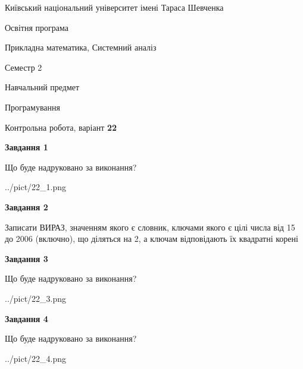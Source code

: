 \documentclass[12pt, ukrainian]{article}
\begin{document}
{{\begin {small}\par
{ \center  Київський національний університет імені Тараса Шевченка \par}
{\parbox {5 cm}{Освітня програма \hfill}{\parbox {8 cm}{Прикладна математика, Системний аналіз \hfill}}\parbox {5 cm}{\hfill Семестр 2}}\par
{\parbox {5 cm} {Навчальний предмет \hfill}\parbox {7 cm}{Програмування \hfill}\parbox {6cm}{\hfill}\par}\vspace{-7pt} \end{small}}{\center Контрольна робота, варіант  \No \textbf
{ 22 }\par}}
{
\begin {large}
{\begin {center}\textbf{Завдання 1}\end {center}}\par
Що буде надруковано за виконання?\par\par
\begin{center}
	{../pict/22_1.png}
\end{center}
\newpage

{\begin {center}\textbf{Завдання 2}\end {center}}\par
Записати ВИРАЗ, значенням якого є словник, ключами якого є цілі числа від 15 до 2006 (включно), що діляться на 2, а ключам відповідають їх квадратні корені\par
\newpage

{\begin {center}\textbf{Завдання 3}\end {center}}\par
Що буде надруковано за виконання?\par
\begin{center}
	{../pict/22_3.png}
\end{center}
\newpage

{\begin {center}\textbf{Завдання 4}\end {center}}\par
Що буде надруковано за виконання?\par
\begin{center}
	{../pict/22_4.png}
\end{center}
\newpage


\end{large}}
\end{document}
